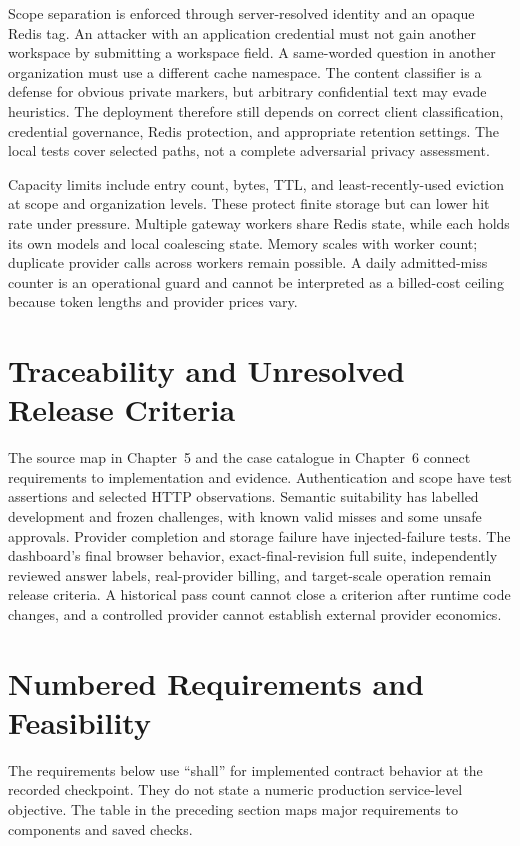 Scope separation is enforced through server-resolved identity and an opaque Redis tag. An attacker with an application credential must not gain another workspace by submitting a workspace field. A same-worded question in another organization must use a different cache namespace. The content classifier is a defense for obvious private markers, but arbitrary confidential text may evade heuristics. The deployment therefore still depends on correct client classification, credential governance, Redis protection, and appropriate retention settings. The local tests cover selected paths, not a complete adversarial privacy assessment.

Capacity limits include entry count, bytes, TTL, and least-recently-used eviction at scope and organization levels. These protect finite storage but can lower hit rate under pressure. Multiple gateway workers share Redis state, while each holds its own models and local coalescing state. Memory scales with worker count; duplicate provider calls across workers remain possible. A daily admitted-miss counter is an operational guard and cannot be interpreted as a billed-cost ceiling because token lengths and provider prices vary.

\section{Traceability and Unresolved Release Criteria}
The source map in Chapter~5 and the case catalogue in Chapter~6 connect requirements to implementation and evidence. Authentication and scope have test assertions and selected HTTP observations. Semantic suitability has labelled development and frozen challenges, with known valid misses and some unsafe approvals. Provider completion and storage failure have injected-failure tests. The dashboard's final browser behavior, exact-final-revision full suite, independently reviewed answer labels, real-provider billing, and target-scale operation remain release criteria. A historical pass count cannot close a criterion after runtime code changes, and a controlled provider cannot establish external provider economics.

\section{Numbered Requirements and Feasibility}
The requirements below use ``shall'' for implemented contract behavior at the recorded checkpoint. They do not state a numeric production service-level objective. The table in the preceding section maps major requirements to components and saved checks.

